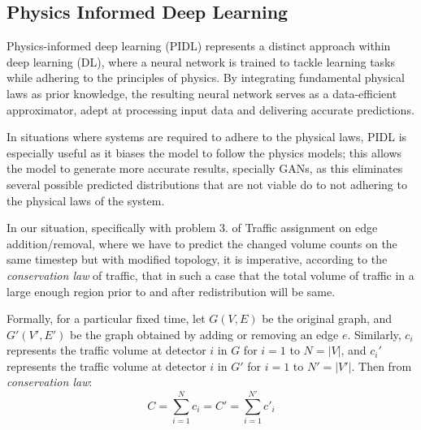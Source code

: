 \subsection{\textbf{Physics Informed Deep Learning}}

Physics-informed deep learning (PIDL) represents a distinct approach within deep learning (DL), where a neural network is trained to tackle learning tasks while adhering to the principles of physics. By integrating fundamental physical laws as prior knowledge, the resulting neural network serves as a data-efficient approximator, adept at processing input data and delivering accurate predictions.

In situations where systems are required to adhere to the physical laws, PIDL is especially useful as it biases the model to follow the physics models; this allows the model to generate more accurate results, specially GANs, as this eliminates several possible predicted distributions that are not viable do to not adhering to the physical laws of the system.

In our situation, specifically with problem 3. of Traffic assignment on edge addition/removal, where we have to predict the changed volume counts on the same timestep but with modified topology, it is imperative, according to the \textit{conservation law} of traffic, that in such a case that the total volume of traffic in a large enough region prior to and after redistribution will be same.

Formally, for a particular fixed time, let \( G(V, E) \) be the original graph, and \( G'(V', E') \) be the graph obtained by adding or removing an edge \( e \). Similarly, \( c_i \) represents the traffic volume at detector \( i \) in \( G \) for \( i = 1 \) to \( N = |V| \), and \( c_i' \) represents the traffic volume at detector \( i \) in \( G' \) for \( i = 1 \) to \( N' = |V'| \). Then from \textit{conservation law}:
\begin{equation}
    C = \sum_{i=1}^{N} c_i = C' = \sum_{i=1}^{N'} c'_i \tag{5}
\end{equation}

